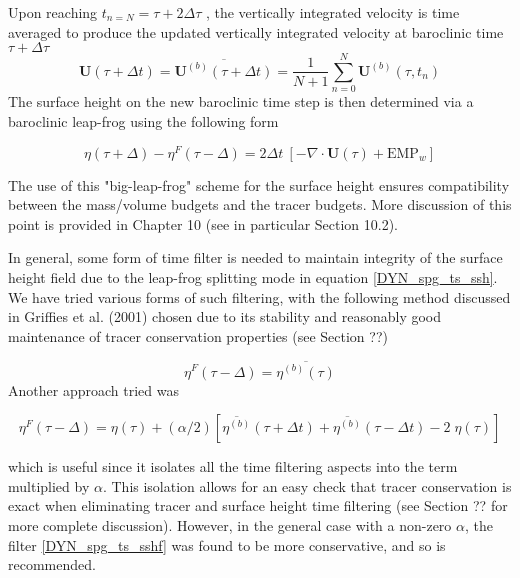 \documentclass[NEMO_book]{subfiles}
\begin{document}
Upon reaching $t_{n=N} = \tau + 2\Delta \tau$ , the vertically integrated velocity is time averaged to produce the updated vertically integrated velocity at baroclinic time $\tau + \Delta \tau$ 
\begin{equation} \label{DYN_spg_ts_u}
\textbf{U}(\tau+\Delta t) = \overline{\textbf{U}^{(b)}(\tau+\Delta t)} 
 	= \frac{1}{N+1} \sum\limits_{n=0}^N\textbf{U}^{(b)}(\tau,t_{n})
\end{equation}
The surface height on the new baroclinic time step is then determined via a baroclinic leap-frog using the following form 

\begin{equation} \label{DYN_spg_ts_ssh}
\eta(\tau+\Delta) - \eta^{F}(\tau-\Delta) = 2\Delta t \ \left[ - \nabla \cdot \textbf{U}(\tau) + \text{EMP}_w \right]  
\end{equation}

 The use of this "big-leap-frog" scheme for the surface height ensures compatibility between the mass/volume budgets and the tracer budgets. More discussion of this point is provided in Chapter 10 (see in particular Section 10.2). 
 
In general, some form of time filter is needed to maintain integrity of the surface 
height field due to the leap-frog splitting mode in equation \ref{DYN_spg_ts_ssh}. We 
have tried various forms of such filtering, with the following method discussed in 
Griffies et al. (2001) chosen due to its stability and reasonably good maintenance of 
tracer conservation properties (see Section ??) 

\begin{equation} \label{DYN_spg_ts_sshf}
\eta^{F}(\tau-\Delta) =  \overline{\eta^{(b)}(\tau)} 
\end{equation}
Another approach tried was 

\begin{equation} \label{DYN_spg_ts_sshf2}
\eta^{F}(\tau-\Delta) = \eta(\tau) 
	+ (\alpha/2) \left[\overline{\eta^{(b)}}(\tau+\Delta t)
				    + \overline{\eta^{(b)}}(\tau-\Delta t) -2 \;\eta(\tau) \right]
\end{equation}

which is useful since it isolates all the time filtering aspects into the term multiplied 
by $\alpha$. This isolation allows for an easy check that tracer conservation is exact when 
eliminating tracer and surface height time filtering (see Section ?? for more complete discussion). However, in the general case with a non-zero $\alpha$, the filter \ref{DYN_spg_ts_sshf} was found to be more conservative, and so is recommended. 
\end{document}

